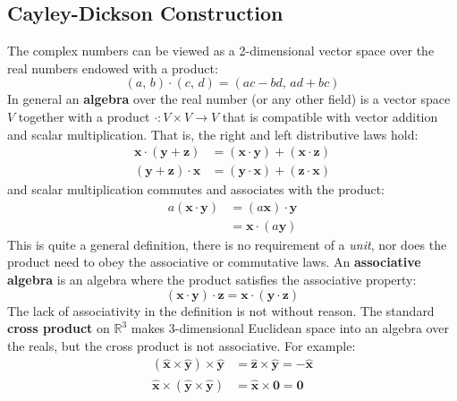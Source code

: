 \documentclass{article}
\begin{document}
        \subsection{Cayley-Dickson Construction}
            The complex numbers can be viewed as a 2-dimensional vector space
            over the real numbers endowed with a product:
            \begin{equation}
                (a,\,b)\cdot(c,\,d)=(ac-bd,\,ad+bc)
            \end{equation}
            In general an \textbf{algebra} over the real number (or any other
            field) is a vector space $V$ together with a product
            $\cdot:V\times{V}\rightarrow{V}$ that is compatible with vector
            addition and scalar multiplication. That is, the right and left
            distributive laws hold:
            \begin{align}
                \mathbf{x}\cdot(\mathbf{y}+\mathbf{z})
                &=(\mathbf{x}\cdot\mathbf{y})
                    +(\mathbf{x}\cdot\mathbf{z})\\
                (\mathbf{y}+\mathbf{z})\cdot\mathbf{x}
                &=(\mathbf{y}\cdot\mathbf{x})
                    +(\mathbf{z}\cdot\mathbf{x})
            \end{align}
            and scalar multiplication commutes and associates with the product:
            \begin{align}
                a(\mathbf{x}\cdot\mathbf{y})
                &=(a\mathbf{x})\cdot\mathbf{y}\\
                &=\mathbf{x}\cdot(a\mathbf{y})
            \end{align}
            This is quite a general definition, there is no requirement of a
            \textit{unit}, nor does the product need to obey the associative or
            commutative laws. An \textbf{associative algebra} is an algebra
            where the product satisfies the associative property:
            \begin{equation}
                (\mathbf{x}\cdot\mathbf{y})\cdot\mathbf{z}
                =\mathbf{x}\cdot(\mathbf{y}\cdot\mathbf{z})
            \end{equation}
            The lack of associativity in the definition is not without reason.
            The standard \textbf{cross product} on $\mathbb{R}^{3}$ makes
            3-dimensional Euclidean space into an algebra over the reals, but
            the cross product is not associative. For example:
            \begin{align}
                (\hat{\mathbf{x}}\times\hat{\mathbf{y}})\times\hat{\mathbf{y}}
                &=\hat{\mathbf{z}}\times\hat{\mathbf{y}}
                =-\hat{\mathbf{x}}\\
                \hat{\mathbf{x}}\times(\hat{\mathbf{y}}\times\hat{\mathbf{y}})
                &=\hat{\mathbf{x}}\times\mathbf{0}
                =\mathbf{0}
            \end{align}
\end{document}
